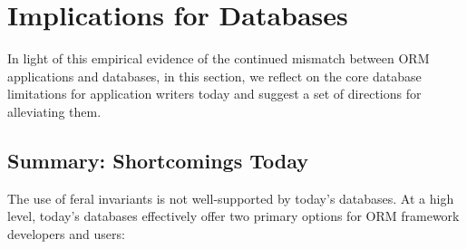 

\section{Implications for Databases}
\label{sec:discussion}

In light of this empirical evidence of the continued mismatch between
ORM applications and databases, in this section, we reflect on the
core database limitations for application writers today and suggest a
set of directions for alleviating them.

\subsection{Summary: Shortcomings Today}

The use of feral invariants is not well-supported by today's
databases. At a high level, today's databases effectively offer two
primary options for ORM framework developers and users:

